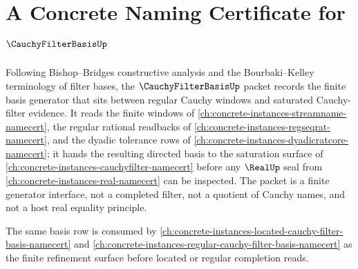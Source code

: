 \chapter{A Concrete Naming Certificate for $\CauchyFilterBasisUp$}
\label{ch:concrete-instances-cauchy-filter-basis-namecert}

Following Bishop--Bridges constructive analysis and the Bourbaki--Kelley terminology of filter bases, the $\CauchyFilterBasisUp$ packet records the finite basis generator that sits between regular Cauchy windows and saturated Cauchy-filter evidence. It reads the finite windows of \autoref{ch:concrete-instances-streamname-namecert}, the regular rational readbacks of \autoref{ch:concrete-instances-regseqrat-namecert}, and the dyadic tolerance rows of \autoref{ch:concrete-instances-dyadicratcore-namecert}; it hands the resulting directed basis to the saturation surface of \autoref{ch:concrete-instances-cauchyfilter-namecert} before any $\RealUp$ seal from \autoref{ch:concrete-instances-real-namecert} can be inspected. The packet is a finite generator interface, not a completed filter, not a quotient of Cauchy names, and not a host real equality principle.

The same basis row is consumed by \autoref{ch:concrete-instances-located-cauchy-filter-basis-namecert} and \autoref{ch:concrete-instances-regular-cauchy-filter-basis-namecert} as the finite refinement surface before located or regular completion reads.

